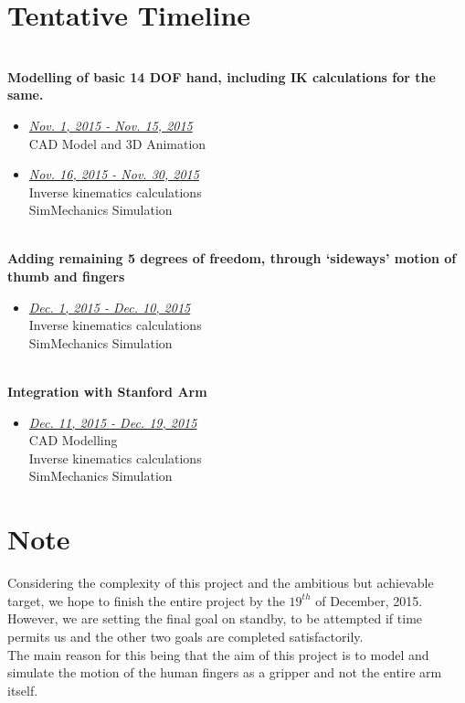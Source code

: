 \documentclass[12pt]{article}
\begin{document}
\section*{Tentative Timeline}
\\
\textbf{Modelling of basic 14 DOF hand, including IK calculations for the same.}\\
\begin{itemize}
\item \textit{\uline{Nov. 1, 2015 - Nov. 15, 2015}}\\
CAD Model and 3D Animation
\item \textit{\uline{Nov. 16, 2015 - Nov. 30, 2015}}\\
Inverse kinematics calculations\\
SimMechanics Simulation
\end{itemize}

\\
\textbf{Adding remaining 5 degrees of freedom, through `sideways' motion of thumb and fingers}\\
\begin{itemize}
\item \textit{\uline{Dec. 1, 2015 - Dec. 10, 2015}}\\
Inverse kinematics calculations\\
SimMechanics Simulation
\end{itemize}

\\
\textbf{Integration with Stanford Arm}\\
\begin{itemize}
\item \textit{\uline{Dec. 11, 2015 - Dec. 19, 2015}}\\
CAD Modelling\\
Inverse kinematics calculations\\
SimMechanics Simulation
\end{itemize}

\bigskip

\section*{Note}
Considering the complexity of this project and the ambitious but achievable target, we hope to finish the entire project by the $19^{th}$ of December, 2015.\\
However, we are setting the final goal on standby, to be attempted if time permits us and the other two goals are completed satisfactorily.\\
The main reason for this being that the aim of this project is to model and simulate the motion of the human fingers as a gripper and not the entire arm itself.
\end{document}
